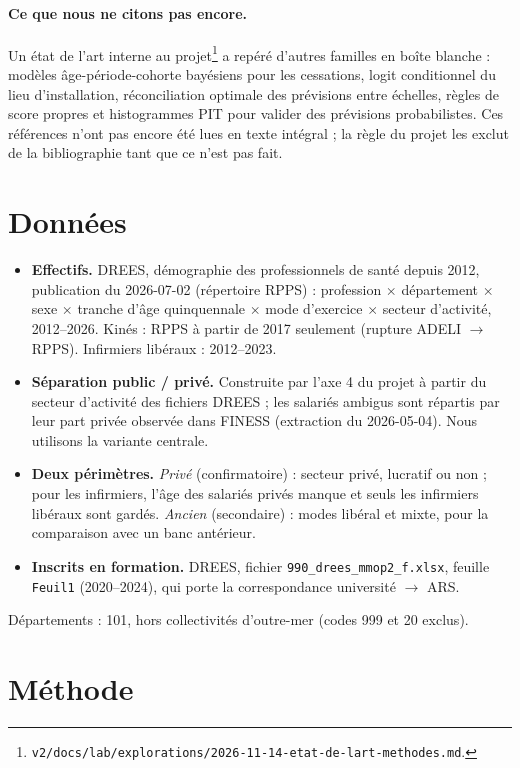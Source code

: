 \paragraph{Ce que nous ne citons pas encore.} Un état de l'art interne au
projet\footnote{\texttt{v2/docs/lab/explorations/2026-11-14-etat-de-lart-methodes.md}.} a repéré
d'autres familles en boîte blanche : modèles âge-période-cohorte bayésiens pour les cessations,
logit conditionnel du lieu d'installation, réconciliation optimale des prévisions entre échelles,
règles de score propres et histogrammes PIT pour valider des prévisions probabilistes. Ces références
n'ont pas encore été lues en texte intégral ; la règle du projet les exclut de la bibliographie tant
que ce n'est pas fait.

\section{Données}
\begin{itemize}
  \item \textbf{Effectifs.} DREES, démographie des professionnels de santé depuis 2012, publication du
        2026-07-02 (répertoire RPPS) : profession $\times$ département $\times$ sexe $\times$ tranche
        d'âge quinquennale $\times$ mode d'exercice $\times$ secteur d'activité, 2012--2026. Kinés : RPPS
        à partir de 2017 seulement (rupture ADELI $\to$ RPPS). Infirmiers libéraux : 2012--2023.
  \item \textbf{Séparation public / privé.} Construite par l'axe 4 du projet à partir du secteur
        d'activité des fichiers DREES ; les salariés ambigus sont répartis par leur part privée
        observée dans FINESS (extraction du 2026-05-04). Nous utilisons la variante centrale.
  \item \textbf{Deux périmètres.} \emph{Privé} (confirmatoire) : secteur privé, lucratif ou non ; pour
        les infirmiers, l'âge des salariés privés manque et seuls les infirmiers libéraux sont gardés.
        \emph{Ancien} (secondaire) : modes libéral et mixte, pour la comparaison avec un banc antérieur.
  \item \textbf{Inscrits en formation.} DREES, fichier \texttt{990\_drees\_mmop2\_f.xlsx}, feuille
        \texttt{Feuil1} (2020--2024), qui porte la correspondance université $\to$ ARS.
\end{itemize}
Départements : 101, hors collectivités d'outre-mer (codes 999 et 20 exclus).

\section{Méthode}
